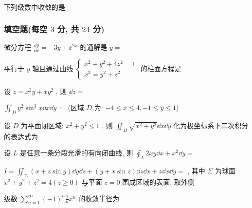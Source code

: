 \begin{ti}
	下列级数中收敛的是 \kuo
\end{ti}

\subsubsection{填空题(每空 $3$ 分, 共 $24$ 分)}
\begin{ti}
	微分方程 $\frac{\dd{y}}{\dd{x}}=-3 y+\ee^{2 x}$ 的通解是 $y=$ \hua{}
\end{ti}

\begin{ti}
	平行于 $y$ 轴且通过曲线 $\begin{cases}
		x^{2}+y^{2}+4 z^{2}=1\\
		x^{2}=y^{2}+z^{2}
	\end{cases}$ 的柱面方程是 \hua{}
\end{ti}

\begin{ti}
	设 $z=x^{2} y+x y^{2}$ , 则 $\dd{z}=$ \hua{}
\end{ti}

\begin{ti}
	$\iint_{D} y^{2} \sin ^{3} x \dd{x} \dd{y}=$ \hua{}(区域 $D$ 为: $-4 \leqslant x \leqslant 4,-1 \leqslant y \leqslant 1$)
\end{ti}

\begin{ti}
	设 $D$ 为平面闭区域: $x^{2}+y^{2} \leqslant 1$ , 则 $\iint_{D} \sqrt{x^{2}+y^{2}} \dd{x} \dd{y}$ 化为极坐标系下二次积分的表达式为 \hua{}
\end{ti}

\begin{ti}
	设 $L$ 是任意一条分段光滑的有向闭曲线, 则 $\oint_{L} 2 x y \dd{x}+x^{2} \dd{y}=$ \hua{}
\end{ti}

\begin{ti}
	$I=\iint_{\Sigma}(x+z \sin y) \dd{y} \dd{z}+(y+x \sin z) \dd{z} \dd{x}+z \dd{x} \dd{y}=$ \hua{}, 其中 $\Sigma$ 为球面 $x^{2}+y^{2}+z^{2}=4(z \geqslant 0)$ 与平面 $z=0$ 围成区域的表面, 取外侧
\end{ti}

\begin{ti}
	级数 $\sum_{n=1}^{\infty}(-1)^{n} \frac{1}{n} x^{n}$ 的收敛半径为 \hua{}
\end{ti}

